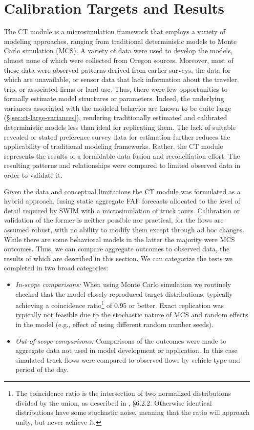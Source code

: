 \section{Calibration Targets and Results}
The CT module is a microsimulation framework that employs a variety of modeling approaches, ranging from traditional deterministic models to Monte Carlo simulation (MCS). A variety of data were used to develop the models, almost none of which were collected from Oregon sources. Moreover, most of these data were observed patterns derived from earlier surveys, the data for which are unavailable, or sensor data that lack information about the traveler, trip, or associated firms or land use. Thus, there were few opportunities to formally estimate model structures or parameters. Indeed, the underlying variances associated with the modeled behavior are known to be quite large (\S\ref{sec:ct-large-variances}), rendering traditionally estimated and calibrated deterministic models less than ideal for replicating them. The lack of suitable revealed or stated preference survey data for estimation further reduces the applicability of traditional modeling frameworks. Rather, the CT module represents the results of a formidable data fusion and reconciliation effort. The resulting patterns and relationships were compared to limited observed data in order to validate it.

Given the data and conceptual limitations the CT module was formulated as a hybrid approach, fusing static aggregate FAF forecasts allocated to the level of detail required by SWIM with a microsimulation of truck tours. Calibration or validation of the former is neither possible nor practical, for the flows are assumed robust, with no ability to modify them except through ad hoc changes. While there are some behavioral models in the latter the majority were MCS outcomes. Thus, we can compare aggregate outcomes to observed data, the results of which are described in this section. We can categorize the tests we completed in two broad categories:
\begin{itemize}
\item \textit{In-scope comparisons:} When using Monte Carlo simulation we routinely checked that the model closely reproduced target distributions, typically achieving a coincidence ratio\footnote{The coincidence ratio is the intersection of two normalized distributions divided by the union, as described in \cite{cambridge10}, \S6.2.2. Otherwise identical distributions have some stochastic noise, meaning that the ratio will approach unity, but never achieve it.} of 0.95 or better. Exact replication was typically not feasible due to the stochastic nature of MCS and random effects in the model (e.g., effect of using different random number seeds). 
\item \textit{Out-of-scope comparisons:} Comparisons of the outcomes were made to aggregate data not used in model development or application. In this case simulated truck flows were compared to observed flows by vehicle type and period of the day.
\end{itemize}

